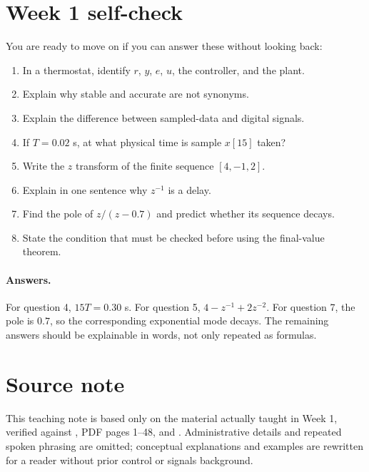 \documentclass[11pt]{article}
\begin{document}
\section{Week 1 self-check}

You are ready to move on if you can answer these without looking back:

\begin{enumerate}
  \item In a thermostat, identify $r$, $y$, $e$, $u$, the controller, and the plant.
  \item Explain why stable and accurate are not synonyms.
  \item Explain the difference between sampled-data and digital signals.
  \item If $T=0.02$ s, at what physical time is sample $x[15]$ taken?
  \item Write the $z$ transform of the finite sequence $[4,-1,2]$.
  \item Explain in one sentence why $z^{-1}$ is a delay.
  \item Find the pole of $z/(z-0.7)$ and predict whether its sequence decays.
  \item State the condition that must be checked before using the final-value theorem.
\end{enumerate}

\paragraph{Answers.}
For question 4, $15T=0.30$ s. For question 5, $4-z^{-1}+2z^{-2}$. For question 7, the pole is $0.7$, so the corresponding exponential mode decays. The remaining answers should be explainable in words, not only repeated as formulas.

\section*{Source note}

This teaching note is based only on the material actually taught in Week 1, verified against , PDF pages 1--48, and . Administrative details and repeated spoken phrasing are omitted; conceptual explanations and examples are rewritten for a reader without prior control or signals background.
\end{document}

